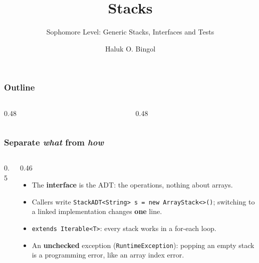 \documentclass[aspectratio=169,10pt,compress]{beamer}
\title{Stacks}
\subtitle{Sophomore Level: Generic Stacks, Interfaces and Tests}
\author[Bingol]{Haluk O. Bingol}
\institute[FCIS]{
    Faculty of Computer and Information Sciences\\
    Yeditepe University
}
\date{
	{\tiny \hbTimeStamp}
}
\begin{document}
\begin{frame}[t,fragile]
  \titlepage
\end{frame}




\begin{frame}[t,fragile] \frametitle{Outline}
  \begin{columns}[T]
    \begin{column}{0.48\textwidth}
      \tableofcontents[sections={1-4}, hideallsubsections]
    \end{column}
    \begin{column}{0.48\textwidth}
      \tableofcontents[sections={5-7}, hideallsubsections]
    \end{column}
  \end{columns}
\end{frame}





\begin{frame}[t,fragile] \frametitle{Separate \emph{what} from \emph{how}}
  \begin{columns}[T]
    \begin{column}{0.5\textwidth}
    \end{column}
    \begin{column}{0.46\textwidth}
      \begin{itemize}\small
        \item The \textbf{interface} is the ADT: the operations, nothing about arrays.
        \item Callers write \texttt{StackADT<String> s = new ArrayStack<>()}; switching to a linked implementation changes \textbf{one} line.
        \item \texttt{extends Iterable<T>}: every stack works in a for-each loop.
        \item An \textbf{unchecked} exception (\texttt{RuntimeException}): popping an empty stack is a programming error, like an array index error.
      \end{itemize}
    \end{column}
  \end{columns}
\end{frame}
\end{document}
